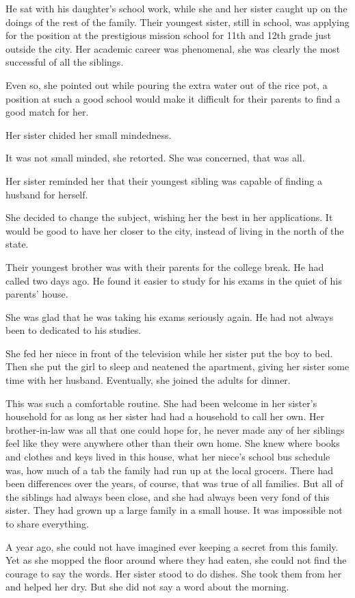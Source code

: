 \documentclass{article}
\begin{document}
He sat with his daughter's school work, while she and her sister caught up on the doings of the rest of the family. Their youngest sister, still in school, was applying for the position at the prestigious mission school for 11th and 12th grade just outside the city. Her academic career was phenomenal, she was clearly the most successful of all the siblings. 

Even so, she pointed out while pouring the extra water out of the rice pot, a position at such a good school would make it difficult for their parents to find a good match for her. 

Her sister chided her small mindedness. 

It was not small minded, she retorted. She was concerned, that was all. 

Her sister reminded her that their youngest sibling was capable of finding a husband for herself. 

She decided to change the subject, wishing her the best in her applications. It would be good to have her closer to the city, instead of living in the north of the state. 

Their youngest brother was with their parents for the college break. He had called two days ago. He found it easier to study for his exams in the quiet of his parents' house. 

She was glad that he was taking his exams seriously again. He had not always been to dedicated to his studies.

She fed her niece in front of the television while her sister put the boy to bed. Then she put the girl to sleep and neatened the apartment, giving her sister some time with her husband. Eventually, she joined the adults for dinner.
 
This was such a comfortable routine. She had been welcome in her sister's household for as long as her sister had had a household to call her own. Her brother-in-law was all that one could hope for, he never made any of her siblings feel like they were anywhere other than their own home. She knew where books and clothes and keys lived in this house, what her niece's school bus schedule was, how much of a tab the family had run up at the local grocers. There had been differences over the years, of course, that was true of all families. But all of the siblings had always been close, and she had always been very fond of this sister. They had grown up a large family in a small house. It was impossible not to share everything. 

A year ago, she could not have imagined ever keeping a secret from this family. Yet as she mopped the floor around where they had eaten, she could not find the courage to say the words. Her sister stood to do dishes. She took them from her and helped her dry. But she did not say a word about the morning. 
\end{document}
